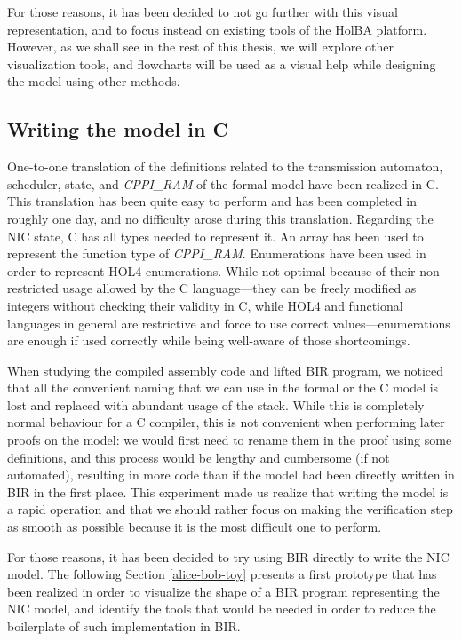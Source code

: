 \documentclass{kththesis}
\begin{document}
{For those reasons, it has been decided to not go further with this visual representation, and to focus instead on existing tools of the HolBA platform. However, as we shall see in the rest of this thesis, we will explore other visualization tools, and flowcharts will be used as a visual help while designing the model using other methods.

\subsection{Writing the model in C} \label{c-model}

One-to-one translation of the definitions related to the transmission automaton, scheduler, state, and \textit{CPPI\_RAM} of the formal model have been realized in C. This translation has been quite easy to perform and has been completed in roughly one day, and no difficulty arose during this translation. Regarding the NIC state, C has all types needed to represent it. An array has been used to represent the function type of \textit{CPPI\_RAM}. Enumerations have been used in order to represent HOL4 enumerations. While not optimal because of their non-restricted usage allowed by the C language---they can be freely modified as integers without checking their validity in C, while HOL4 and functional languages in general are restrictive and force to use correct values---enumerations are enough if used correctly while being well-aware of those shortcomings.

When studying the compiled assembly code and lifted BIR program, we noticed that all the convenient naming that we can use in the formal or the C model is lost and replaced with abundant usage of the stack. While this is completely normal behaviour for a C compiler, this is not convenient when performing later proofs on the model: we would first need to rename them in the proof using some definitions, and this process would be lengthy and cumbersome (if not automated), resulting in more code than if the model had been directly written in BIR in the first place. This experiment made us realize that writing the model is a rapid operation and that we should rather focus on making the verification step as smooth as possible because it is the most difficult one to perform.

For those reasons, it has been decided to try using BIR directly to write the NIC model. The following Section \ref{alice-bob-toy} presents a first prototype that has been realized in order to visualize the shape of a BIR program representing the NIC model, and identify the tools that would be needed in order to reduce the boilerplate of such implementation in BIR.

}
\end{document}
